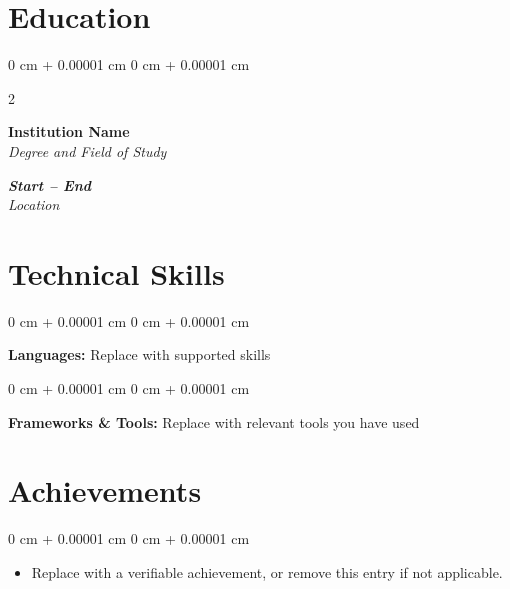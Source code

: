 \documentclass[10pt, letterpaper]{article}
\newenvironment{highlights}{
    \begin{itemize}[
        topsep=0.10 cm,
        parsep=0.10 cm,
        partopsep=0pt,
        itemsep=0pt,
        leftmargin=0.2 cm + 10pt
    ]
}{
    \end{itemize}
} %
\newenvironment{onecolentry}{
    \begin{adjustwidth}{
        0 cm + 0.00001 cm
    }{
        0 cm + 0.00001 cm
    }
}{
    \end{adjustwidth}
} %
\newenvironment{twocolentry}[2][]{
    \onecolentry
    \def\secondColumn{#2}
    \setcolumnwidth{\fill, 4.5 cm}
    \begin{paracol}{2}
}{
    \switchcolumn \raggedleft \secondColumn
    \end{paracol}
    \endonecolentry
} %
\begin{document}
\section{\textbf{Education}}
\begin{twocolentry}{\textbf{\textit{Start -- End}}\\\textit{Location}}
\textbf{Institution Name}\\
\textit{Degree and Field of Study}
\end{twocolentry}

\section{\textbf{Technical Skills}}
\begin{onecolentry}
\textbf{Languages:} Replace with supported skills
\end{onecolentry}
\vspace{0.15 cm}
\begin{onecolentry}
\textbf{Frameworks \& Tools:} Replace with relevant tools you have used
\end{onecolentry}

\section{\textbf{Achievements}}
\begin{onecolentry}
\begin{highlights}
\item Replace with a verifiable achievement, or remove this entry if not applicable.
\end{highlights}
\end{onecolentry}
\end{document}
